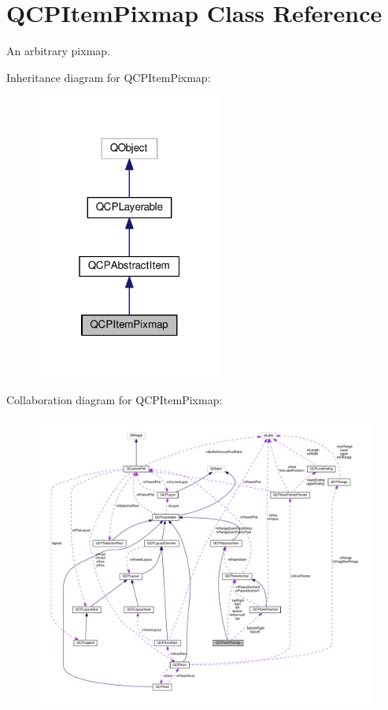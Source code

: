 \hypertarget{classQCPItemPixmap}{}\section{Q\+C\+P\+Item\+Pixmap Class Reference}
\label{classQCPItemPixmap}


An arbitrary pixmap.  




Inheritance diagram for Q\+C\+P\+Item\+Pixmap\+:
\nopagebreak
\begin{figure}[H]
\begin{center}
\leavevmode
\includegraphics[width=175pt]{classQCPItemPixmap__inherit__graph}
\end{center}
\end{figure}


Collaboration diagram for Q\+C\+P\+Item\+Pixmap\+:
\nopagebreak
\begin{figure}[H]
\begin{center}
\leavevmode
\includegraphics[width=350pt]{classQCPItemPixmap__coll__graph}
\end{center}
\end{figure}
